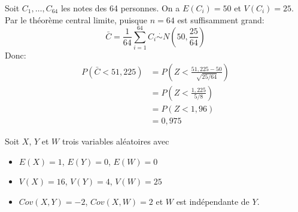 \begin{questions}
\begin{parts}
\begin{solution}
    Soit $C_1,\hdots,C_{64}$ les notes des 64 personnes. On a $E(C_i)=50$ et $V(C_i)=25$. Par le théorème central limite, puisque $n=64$ est suffisamment grand:
    $$\bar{C}=\frac{1}{64}\sum_{i=1}^{64}C_i \stackrel{\cdot}{\sim} N\left(50,\frac{25}{64}\right)$$
    Donc:
    \begin{align*}
        P(\bar{C}<51{,}225)&=P\left(Z<\frac{51{,}225-50}{\sqrt{25/64}}\right)\\
        &= P\left(Z<\frac{1{,}225}{5/8}\right)\\
        &= P(Z<1{,}96)\\
        &= 0{,}975
    \end{align*}
\end{solution}
\end{parts}

\pageblanche
\question\label{cov}

Soit $X$, $Y$ et $W$ trois variables aléatoires avec
\begin{itemize}
\item $E(X)=1$, $E(Y)=0$, $E(W)=0$
\item $V(X)=16$, $V(Y)=4$, $V(W)=25$
\item $Cov(X,Y)=-2$, $Cov(X,W)=2$ et $W$ est indépendante de $Y$.
\end{itemize}








\end{questions}

